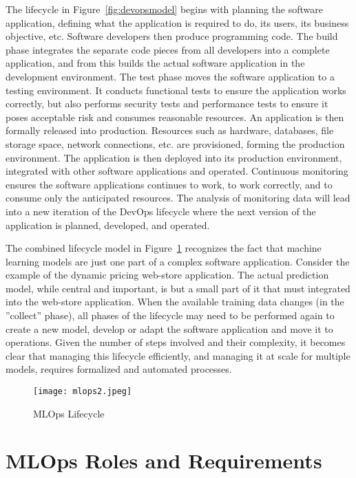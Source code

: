 The lifecycle in Figure~\ref{fig:devopsmodel} begins with planning the software application, defining what the application is required to do, its users, its business objective, etc. Software developers then produce programming code. The build phase integrates the separate code pieces from all developers into a complete application, and from this builds the actual software application in the development environment. The test phase moves the software application to a testing environment. It conducts functional tests to ensure the application works correctly, but also performs security tests and performance tests to ensure it poses acceptable risk and consumes reasonable resources. An application is then formally released into production. Resources such as hardware, databases, file storage space, network connections, etc. are provisioned, forming the production environment. The application is then deployed into its production environment, integrated with other software applications and operated. Continuous monitoring ensures the software applications continues to work, to work correctly, and to consume only the anticipated resources. The analysis of monitoring data will lead into a new iteration of the DevOps lifecycle where the next version of the application is planned, developed, and operated.

The combined lifecycle model in Figure~\ref{fig:mlopslifecycle} recognizes the fact that machine learning models are just one part of a complex software application. Consider the example of the dynamic pricing web-store application. The actual prediction model, while central and important, is but a small part of it that must integrated into the web-store application. When the available training data changes (in the ''collect'' phase), all phases of the lifecycle may need to be performed again to create a new model, develop or adapt the software application and move it to operations. Given the number of steps involved and their complexity, it becomes clear that managing this lifecycle efficiently, and managing it at scale for multiple models, requires formalized and automated processes.

\begin{figure}
\centering
\texttt{[image: mlops2.jpeg]}
\caption{MLOps Lifecycle}
\label{fig:mlopslifecycle}
\end{figure}

\FloatBarrier

\section{MLOps Roles and Requirements}

